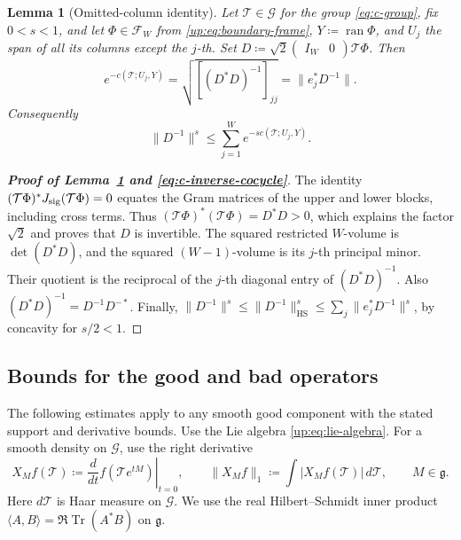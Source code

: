 \documentclass[11pt]{article}
\numberwithin{equation}{section}
\newtheorem{lemma}[theorem]{Lemma}
\theoremstyle{remark}
\newcommand{\Tr}{\operatorname{Tr}}
\begin{document}
\begin{lemma}[Omitted-column identity]\label{cc:lem:cofactor}
Let $\mathcal T\in\mathcal G$ for the group \eqref{eq:c-group}, fix $0<s<1$,
and let $\Phi\in\mathcal F_W$ from \eqref{up:eq:boundary-frame},
\(Y\coloneqq \operatorname{ran}\Phi\), and \(U_j\) the span of all its columns
except the \(j\)-th. Set $D\coloneqq\sqrt2\begin{pmatrix}I_W&0\end{pmatrix}\mathcal T\Phi$.
Then
\begin{equation}
 e^{-c(\mathcal T;U_j,Y)}
 =\sqrt{[(D^*D)^{-1}]_{jj}}
 =\|e_j^*D^{-1}\|.
 \label{cc:eq:cofactor}
\end{equation}
Consequently
\begin{equation}
 \|D^{-1}\|^s\le\sum_{j=1}^W e^{-sc(\mathcal T;U_j,Y)} .
 \label{cc:eq:inverse}
\end{equation}
\end{lemma}
\begin{proof}[\textbf{Proof of Lemma~\ref{cc:lem:cofactor} and \eqref{eq:c-inverse-cocycle}}]
The identity \((\mathcal T\Phi)^*J_{\rm sig}(\mathcal T\Phi)=0\) equates the Gram matrices
of the upper and lower blocks, including cross terms. Thus
\((\mathcal T\Phi)^*(\mathcal T\Phi)=D^*D>0\), which explains the factor \(\sqrt2\)
and proves that \(D\) is invertible.
The squared restricted \(W\)-volume is \(\det(D^*D)\), and the squared
\((W-1)\)-volume is its \(j\)-th principal minor. Their quotient is
the reciprocal of the \(j\)-th diagonal entry of \((D^*D)^{-1}\).
Also \((D^*D)^{-1}=D^{-1}D^{-*}\).
Finally,
\(\|D^{-1}\|^s\le\|D^{-1}\|_\mathrm{HS}^s
\le\sum_j\|e_j^*D^{-1}\|^s\), by concavity for \(s/2<1\).
\end{proof}

\subsection{Bounds for the good and bad operators}
\label{app:c-operator-proofs}

The following estimates apply to any smooth good component with the
stated support and derivative bounds. Use the Lie algebra
\eqref{up:eq:lie-algebra}. For a smooth density on $\mathcal G$, use the right derivative
\cite[(3)]{Drogin}
\begin{equation}\label{eq:c-right-derivative}
 X_Mf(\mathcal T)\coloneqq\left.\frac{d}{dt}f(\mathcal T e^{tM})\right|_{t=0},\qquad
 \|X_Mf\|_1\coloneqq\int|X_Mf(\mathcal T)|\,d\mathcal T,
 \qquad M\in\mathfrak g.
\end{equation}
Here $d\mathcal T$ is Haar measure on $\mathcal G$. We use the real
Hilbert--Schmidt inner product
$\langle A,B\rangle=\Re\Tr(A^*B)$ on $\mathfrak g$.
\end{document}

